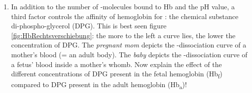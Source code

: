 
%


	 \areaset[0cm]{14cm}{28cm}   %


\begin{enumerate}[itemsep=1.5em, leftmargin=*]
\item  In addition to the number of  -molecules bound to Hb and the pH value, a third factor controls the affinity of hemoglobin for  : the chemical substance di-phospho-glycerol (DPG). This is best seen figure \ref{fig:HbRechtsverschiebung}: the more to the left a curve lies, the lower the concentration of DPG. The \textit{pregnant mom} depicts the  -dissociation curve of a mother's blood (= an adult body). The \textit{baby} depicts the  -dissociation curve of a fetus' blood inside a mother's whomb. Now explain the effect of the different concentrations of DPG present in the fetal hemoglobin (Hb\textsubscript{f}) compared to DPG present in the adult hemoglobin (Hb\textsubscript{a})!
\end{enumerate}


